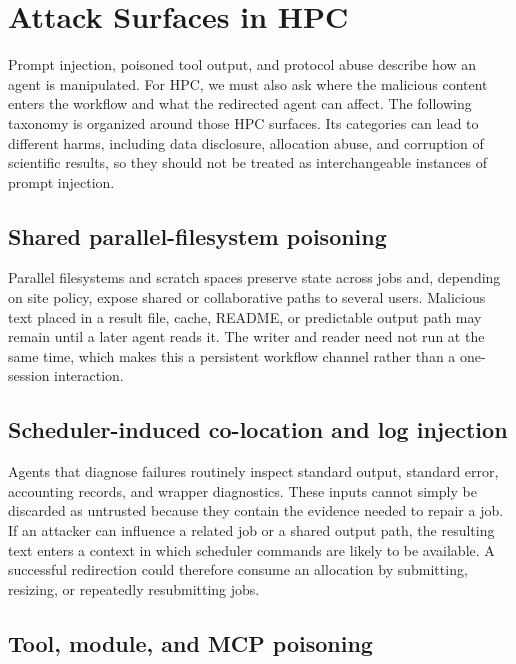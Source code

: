 \section{Attack Surfaces in HPC}
\label{sec:taxonomy}

Prompt injection, poisoned tool output, and protocol abuse describe how an agent is manipulated. For HPC, we must also ask where the malicious content enters the workflow and what the redirected agent can affect. The following taxonomy is organized around those HPC surfaces. Its categories can lead to different harms, including data disclosure, allocation abuse, and corruption of scientific results, so they should not be treated as interchangeable instances of prompt injection.

\subsection{Shared parallel-filesystem poisoning}
\label{sec:taxonomy-filesystem}

Parallel filesystems and scratch spaces preserve state across jobs and, depending on site policy, expose shared or collaborative paths to several users. Malicious text placed in a result file, cache, README, or predictable output path may remain until a later agent reads it. The writer and reader need not run at the same time, which makes this a persistent workflow channel rather than a one-session interaction.

\subsection{Scheduler-induced co-location and log injection}
\label{sec:taxonomy-scheduler}

Agents that diagnose failures routinely inspect standard output, standard error, accounting records, and wrapper diagnostics. These inputs cannot simply be discarded as untrusted because they contain the evidence needed to repair a job. If an attacker can influence a related job or a shared output path, the resulting text enters a context in which scheduler commands are likely to be available. A successful redirection could therefore consume an allocation by submitting, resizing, or repeatedly resubmitting jobs.

\subsection{Tool, module, and MCP poisoning}
\label{sec:tool-poisoning}

